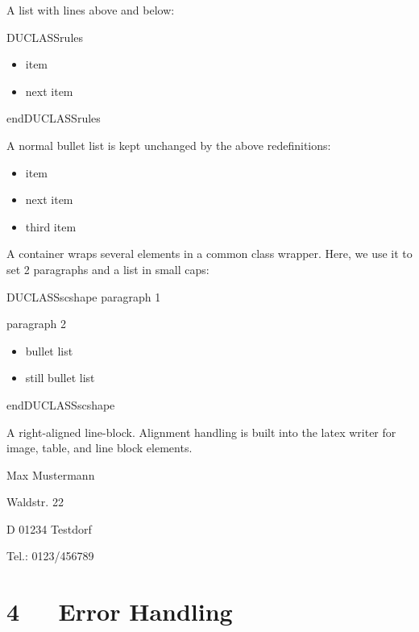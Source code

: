 \documentclass[a4paper]{memoir}
\newenvironment{DUclass}[1]%
  {%
   \def\DocutilsClassFunctionName{DUCLASS#1}
     \csname \DocutilsClassFunctionName \endcsname}%
  {\csname end\DocutilsClassFunctionName \endcsname}%
\newenvironment{DUlineblock}[1]{%
    \list{}{\setlength{\partopsep}{\parskip}
            \addtolength{\partopsep}{\baselineskip}
            \setlength{\topsep}{0pt}
            \setlength{\itemsep}{0.15\baselineskip}
            \setlength{\parsep}{0pt}
            \setlength{\leftmargin}{#1}}
    \raggedright
  }
  {\endlist}
\begin{document}
A list with lines above and below:

\begin{DUclass}{rules}
\begin{itemize}
\item item

\item next item
\end{itemize}
\end{DUclass}

A normal bullet list is kept unchanged by the above redefinitions:

\begin{itemize}
\item item

\item next item

\item third item
\end{itemize}

A container wraps several elements in a common \textquotedbl{}class wrapper\textquotedbl{}. Here, we use
it to set 2 paragraphs and a list in small caps:

\newcommand*{\DUCLASSscshape}{\scshape}

\begin{DUclass}{scshape}
paragraph 1

paragraph 2

\begin{itemize}
\item bullet list

\item still bullet list
\end{itemize}
\end{DUclass}

A right-aligned line-block. Alignment handling is built into the latex
writer for image, table, and line block elements.

\begin{DUlineblock}{0em}
\raggedleft
\item[] Max Mustermann
\item[] Waldstr. 22
\item[] D 01234 Testdorf
\item[] Tel.: 0123/456789
\end{DUlineblock}



\chapter{4   Error Handling%
  \label{error-handling}%
}
\end{document}
